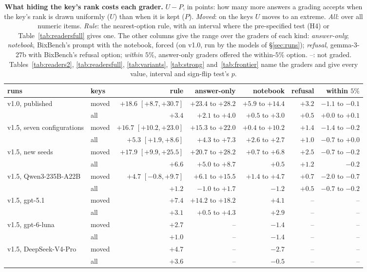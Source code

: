 \documentclass{article}
\begin{document}
\begin{table}[t]
\centering\footnotesize\setlength{\tabcolsep}{3pt}
\caption{\textbf{What hiding the key's rank costs each grader.} $U-P$, in points: how many more answers a grading
accepts when the key's rank is drawn uniformly ($U$) than when it is kept ($P$). \emph{Moved}: on the keys $U$ moves
to an extreme. \emph{All}: over all numeric items. \emph{Rule}: the nearest-option rule, with an interval where the
pre-specified test (H4) or Table~\ref{tab:readersfull} gives one. The other columns give the range over the graders
of each kind: \emph{answer-only}; \emph{notebook}, BixBench's prompt with the notebook, forced (on v1.0, run by the models of \S\ref{sec:runs}); \emph{refusal},
gemma-3-27b with BixBench's refusal option; \emph{within $5\%$}, answer-only graders offered the within-$5\%$ option. --: not graded.
Tables~\ref{tab:readers2}, \ref{tab:readersfull}, \ref{tab:variants}, \ref{tab:strong} and~\ref{tab:frontier} name
the graders and give every value, interval and sign-flip test's $p$.}
\label{tab:cost}
\begin{tabular}{llrrrrr}
\toprule
runs & keys & rule & answer-only & notebook & refusal & within $5\%$\\
\midrule
v1.0, published & moved & $+18.6$ {\scriptsize$[+8.7,+30.7]$} & $+23.4$ to $+28.2$ & $+5.9$ to $+14.4$ & $+3.2$ & $-1.1$ to $-0.1$\\
 & all & $+3.4$ & $+2.1$ to $+4.0$ & $+0.5$ to $+3.0$ & $+0.5$ & $+0.0$ to $+0.1$\\
v1.5, seven configurations & moved & $+16.7$ {\scriptsize$[+10.2,+23.0]$} & $+15.3$ to $+22.0$ & $+0.4$ to $+10.2$ & $+1.4$ & $-1.4$ to $-0.2$\\
 & all & $+5.3$ {\scriptsize$[+1.9,+8.6]$} & $+4.3$ to $+7.3$ & $+2.6$ to $+2.7$ & $+1.0$ & $-0.7$ to $+0.0$\\
v1.5, new seeds & moved & $+17.9$ {\scriptsize$[+9.9,+25.5]$} & $+20.7$ to $+28.2$ & $+0.7$ to $+6.8$ & $+2.5$ & $-0.7$ to $-0.2$\\
 & all & $+6.6$ & $+5.0$ to $+8.7$ & $+0.5$ & $+1.2$ & $-0.2$\\
v1.5, Qwen3-235B-A22B & moved & $+4.7$ {\scriptsize$[-0.8,+9.7]$} & $+6.1$ to $+15.5$ & $+1.4$ to $+4.7$ & $+0.7$ & $-2.0$ to $-0.7$\\
 & all & $+1.2$ & $-1.0$ to $+1.7$ & $-1.2$ & $+0.5$ & $-0.7$ to $-0.2$\\
v1.5, gpt-5.1 & moved & $+7.4$ & $+14.2$ to $+18.2$ & $+4.1$ & -- & --\\
 & all & $+3.1$ & $+0.5$ to $+4.3$ & $+2.9$ & -- & --\\
v1.5, gpt-6-luna & moved & $+2.7$ & -- & $-1.4$ & -- & --\\
 & all & $+1.0$ & -- & $-1.4$ & -- & --\\
v1.5, DeepSeek-V4-Pro & moved & $+4.7$ & -- & $-2.7$ & -- & --\\
 & all & $+3.6$ & -- & $-0.5$ & -- & --\\
\bottomrule
\end{tabular}
\end{table}
\end{document}
